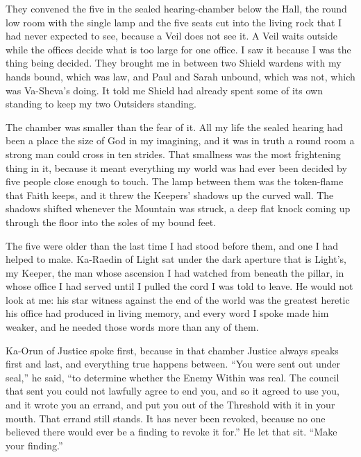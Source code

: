 
They convened the five in the sealed hearing-chamber below the Hall, the round low room with the single lamp and the five seats cut into the living rock that I had never expected to see, because a Veil does not see it. A Veil waits outside while the offices decide what is too large for one office. I saw it because I was the thing being decided. They brought me in between two Shield wardens with my hands bound, which was law, and Paul and Sarah unbound, which was not, which was Va-Sheva's doing. It told me Shield had already spent some of its own standing to keep my two Outsiders standing.\par

The chamber was smaller than the fear of it. All my life the sealed hearing had been a place the size of God in my imagining, and it was in truth a round room a strong man could cross in ten strides. That smallness was the most frightening thing in it, because it meant everything my world was had ever been decided by five people close enough to touch. The lamp between them was the token-flame that Faith keeps, and it threw the Keepers' shadows up the curved wall. The shadows shifted whenever the Mountain was struck, a deep flat knock coming up through the floor into the soles of my bound feet.\par

The five were older than the last time I had stood before them, and one I had helped to make. Ka-Raedin of Light sat under the dark aperture that is Light's, my Keeper, the man whose ascension I had watched from beneath the pillar, in whose office I had served until I pulled the cord I was told to leave. He would not look at me: his star witness against the end of the world was the greatest heretic his office had produced in living memory, and every word I spoke made him weaker, and he needed those words more than any of them.\par

Ka-Orun of Justice spoke first, because in that chamber Justice always speaks first and last, and everything true happens between. ``You were sent out under seal,'' he said, ``to determine whether the Enemy Within was real. The council that sent you could not lawfully agree to end you, and so it agreed to use you, and it wrote you an errand, and put you out of the Threshold with it in your mouth. That errand still stands. It has never been revoked, because no one believed there would ever be a finding to revoke it for.'' He let that sit. ``Make your finding.''\par

